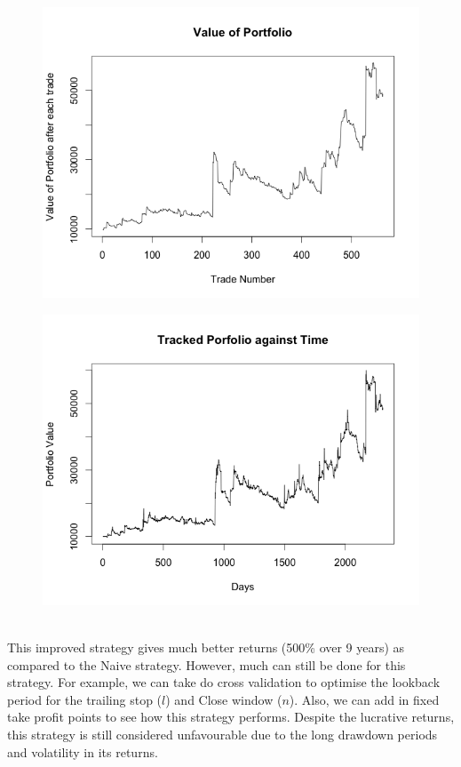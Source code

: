 \documentclass[12pt]{article}
\theoremstyle{definition}
\begin{document}
\begin{figure}[ht]
\centering
\begin{minipage}{0.45\textwidth}
  \centering
  \includegraphics[width=1\textwidth]{ts4}
  \label{fig:test3}
\end{minipage}
\begin{minipage}{0.45\textwidth}
  \centering
  \includegraphics[width=1\textwidth]{ts5}
  \label{fig:test4}
\end{minipage}
\end{figure}\\
This improved strategy gives much better returns (500\% over 9 years) as compared to the Naive strategy. However, much can still be done for this strategy. For example, we can take do cross validation to optimise the lookback period for the trailing stop ($l$) and Close window ($n$). Also, we can add in fixed take profit points to see how this strategy performs. Despite the lucrative returns, this strategy is still considered unfavourable due to the long drawdown periods and volatility in its returns.
\end{document}
